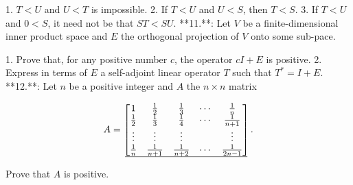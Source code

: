 1. \(T<U\) and \(U<T\) is impossible.
2. If \(T<U\) and \(U<S\), then \(T<S\).
3. If \(T<U\) and \(0<S\), it need not be that \(ST<SU\).
**11.**: Let \(V\) be a finite-dimensional inner product space and \(E\) the orthogonal projection of \(V\) onto some sub-pace.

1. Prove that, for any positive number \(c\), the operator \(cI+E\) is positive.
2. Express in terms of \(E\) a self-adjoint linear operator \(T\) such that \(T^{*}=I+E\).
**12.**: Let \(n\) be a positive integer and \(A\) the \(n\times n\) matrix

\[A=\begin{bmatrix}1&\frac{1}{2}&\frac{1}{3}&\cdots&\frac{1}{n}\\ \frac{1}{2}&\frac{1}{3}&\frac{1}{4}&\cdots&\frac{1}{n+1}\\ \vdots&\vdots&\vdots&&\vdots\\ \frac{1}{n}&\frac{1}{n+1}&\frac{1}{n+2}&\cdots&\frac{1}{2n-1}\\ \hline\end{bmatrix}.\]

Prove that \(A\) is positive.

 